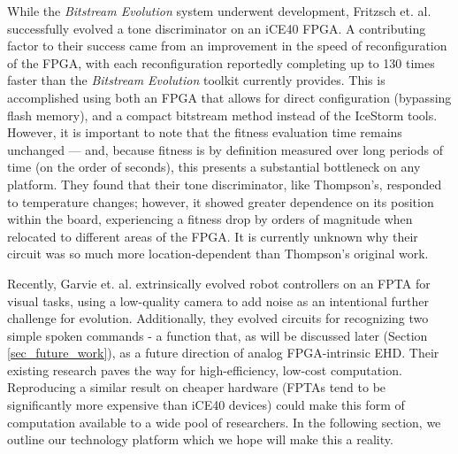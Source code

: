 \documentclass{ieeeaccess}
\newcommand{\highlight}[1]{#1}
\begin{document}
While the \textit{Bitstream Evolution} system underwent development, Fritzsch et. al. \cite{HoffmannCoBEA:Bitstreams} successfully evolved a tone discriminator on an iCE40 FPGA. A contributing factor to their success came from an improvement in the speed of reconfiguration of the FPGA, with each reconfiguration reportedly completing up to 130 times faster than the \textit{Bitstream Evolution} toolkit currently provides. This is accomplished using both an FPGA that allows for direct configuration (bypassing flash memory), and a compact bitstream method instead of the IceStorm tools. However, it is important to note that the fitness evaluation time remains unchanged --- and, because fitness is by definition measured over long periods of time (on the order of seconds), this presents a substantial bottleneck on any platform. They found that their tone discriminator, like Thompson's, responded to temperature changes; however, it showed greater dependence on its position within the board, experiencing a fitness drop by orders of magnitude when relocated to different areas of the FPGA.
It is currently unknown why their circuit was so much more location-dependent than Thompson's original work\cite{10.5555/645507.656736}.


Recently, Garvie et. al. \cite{Garvie2020EvolvedControllers} extrinsically evolved robot controllers on an FPTA for visual tasks, using a low-quality camera to add noise as an intentional further challenge for evolution. Additionally, they evolved circuits for recognizing two simple spoken commands - a function that, as will be discussed later (Section \ref{sec_future_work}), as a future direction of analog FPGA-intrinsic EHD. Their existing research paves the way for high-efficiency, low-cost computation. Reproducing a similar result on cheaper hardware \highlight{(FPTAs tend to be significantly more expensive than iCE40 devices)} could make this form of computation available to a wide pool of researchers. In the following section, we outline our technology platform which we hope will make this a reality.

\newpage
\end{document}
